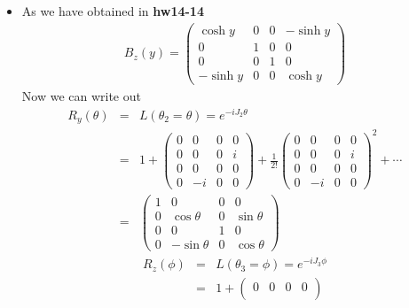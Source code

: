 \documentclass[11pt]{article}
\begin{document}
\section{ }
\begin{itemize}
    \item As we have obtained in {\bf hw14-14}
    \begin{eqnarray}
        B_z(y)=
        \begin{pmatrix}
            \cosh y & 0 & 0 & -\sinh y \\
            0 & 1 & 0 & 0 \\
            0 & 0 & 1 & 0 \\
            -\sinh y & 0 & 0 & \cosh y
        \end{pmatrix}
    \end{eqnarray}
    Now we can write out
    \begin{eqnarray}
        R_y(\theta)&=&L(\theta_2=\theta)=e^{-iJ_2\theta}\\ 
        &=&1+
        \begin{pmatrix}
            0 & 0 & 0 & 0 \\
            0 & 0 & 0 & i \\
            0 & 0 & 0 & 0 \\
            0 & -i & 0 & 0 
        \end{pmatrix}
        +\frac{1}{2!}
        \begin{pmatrix}
            0 & 0 & 0 & 0 \\
            0 & 0 & 0 & i \\
            0 & 0 & 0 & 0 \\
            0 & -i & 0 & 0 
        \end{pmatrix}^2
          +\cdots \\
        &=&
        \begin{pmatrix}
            1 & 0 & 0 & 0 \\
            0 & \cos\theta & 0 & \sin\theta \\
            0 & 0 & 1 & 0 \\
            0 & -\sin\theta & 0 & \cos\theta 
        \end{pmatrix}
    \end{eqnarray}
    \begin{eqnarray}
        R_z(\phi)&=&L(\theta_3=\phi)=e^{-iJ_3\phi} \\ 
        &=& 1+
        \begin{pmatrix}
            0 & 0 & 0 & 0 \\

\end{pmatrix}
\end{eqnarray}
\end{itemize}
\end{document}
